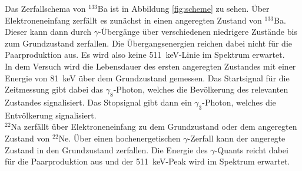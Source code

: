 Das Zerfallschema von $^{133}$Ba ist in Abbildung \ref{fig:scheme} zu sehen. Über Elektroneneinfang zerfällt es zunächst in einen angeregten Zustand von $^{133}$Ba. Dieser kann dann durch $\gamma$-Übergänge über verschiedenen niedrigere Zustände bis zum Grundzustand zerfallen. Die Übergangsenergien reichen dabei nicht für die Paarproduktion aus. Es wird also keine \SI{511}{\kilo\electronvolt}-Linie im Spektrum erwartet. \\

In dem Versuch wird die Lebensdauer des ersten angeregten Zustandes mit einer Energie von \SI{81}{\kilo\electronvolt} über dem Grundzustand gemessen. Das Startsignal für die Zeitmessung gibt dabei das $\gamma_8$-Photon, welches die Bevölkerung des relevanten Zustandes signalisiert. Das Stopsignal gibt dann ein $\gamma_3$-Photon, welches die Entvölkerung signalisiert. \\

$^{22}$Na zerfällt über Elektroneneinfang zu dem Grundzustand oder dem angeregten Zustand von $^{22}$Ne. Über einen hochenergetischen $\gamma$-Zerfall kann der angeregte Zustand in den Grundzustand zerfallen. Die Energie des $\gamma$-Quants reicht dabei für die Paarproduktion aus und der \SI{511}{\kilo\electronvolt}-Peak wird im Spektrum erwartet.
